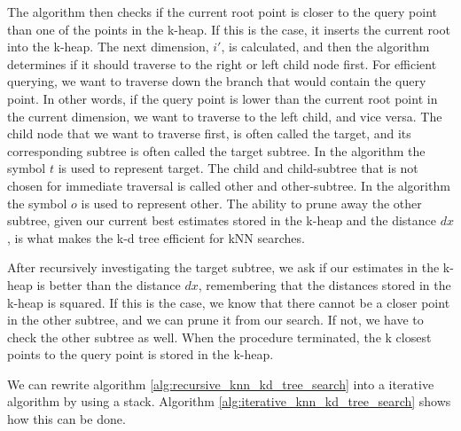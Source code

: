 The algorithm then checks if the current root point is closer to the query point than one of the points in the k-heap. If this is the case, it inserts the current root into the k-heap. The next dimension, $i'$, is calculated, and then the algorithm determines if it should traverse to the right or left child node first. For efficient querying, we want to traverse down the branch that would contain the query point. In other words, if the query point is lower than the current root point in the current dimension, we want to traverse to the left child, and vice versa. The child node that we want to traverse first, is often called the target, and its corresponding subtree is often called the target subtree. In the algorithm the symbol $t$ is used to represent target. The child and child-subtree that is not chosen for immediate traversal is called other and other-subtree. In the algorithm the symbol $o$ is used to represent other. The ability to prune away the other subtree, given our current best estimates stored in the k-heap and the distance $dx$, is what makes the k-d tree efficient for kNN searches.

After recursively investigating the target subtree, we ask if our estimates in the k-heap is better than the distance $dx$, remembering that the distances stored in the k-heap is squared. If this is the case, we know that there cannot be a closer point in the other subtree, and we can prune it from our search. If not, we have to check the other subtree as well. When the procedure terminated, the k closest points to the query point is stored in the k-heap.


We can rewrite algorithm \ref{alg:recursive_knn_kd_tree_search} into a iterative algorithm by using a stack. Algorithm \ref{alg:iterative_knn_kd_tree_search} shows how this can be done.

